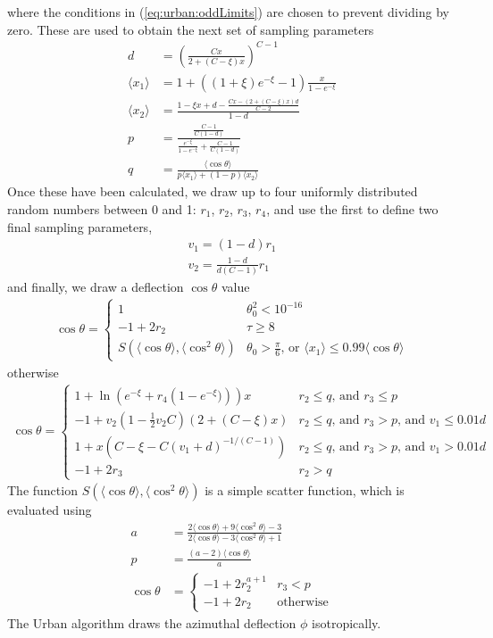 \documentclass[12pt]{article}
\numberwithin{equation}{section}
\begin{document}
%
where the conditions in (\ref{eq:urban:oddLimits}) are chosen to prevent dividing by zero. These are used to obtain the next set of sampling parameters
%
\begin{align}
  d &= \left(\frac{Cx}{2 + (C-\xi)x}\right)^{C-1} \\
  \langle x_1 \rangle &= 1+((1+\xi)e^{-\xi}-1)\frac{x}{1-e^{-\xi}} \\
  \langle x_2 \rangle &= \frac{1-\xi x + d - \frac{Cx-(2+(C-\xi)x)d}{C-2}}{1-d}\\
  p &= \frac{\frac{C-1}{C(1-d)}}{\frac{e^{-\xi}}{1-e^{-\xi}} + \frac{C-1}{C(1-d)}} \\
  q &= \frac{\langle\cos\theta\rangle}{p\langle x_1\rangle + (1-p)\langle x_2\rangle}
\end{align}
%
Once these have been calculated, we draw up to four uniformly distributed random numbers between 0 and 1: $r_1$, $r_2$, $r_3$, $r_4$, and use the first to define two final sampling parameters,
%
\begin{align}
  v_1 = (1-d)r_1 \\
  v_2 = \frac{1-d}{d(C-1)}r_1
\end{align}
%
and finally, we draw a deflection $\cos\theta$ value
%
\begin{align}
  \cos\theta = 
  \begin{cases}
    1         & \theta_0^2 < 10^{-16} \\
    -1 + 2r_2 & \tau \geq 8  \\
    S(\langle\cos\theta\rangle, \langle\cos^2\theta\rangle) & \theta_0 > \frac{\pi}{6} \text{, or } \langle x_1 \rangle\leq 0.99\langle\cos\theta\rangle
  \end{cases}
\end{align}
%
otherwise
%
\begin{align}
  \cos\theta = 
  \begin{cases}
    1 + \ln\left(e^{-\xi} + r_4\left(1-e^{-\xi})\right)\right)x & r_2 \leq q \text{, and } r_3 \leq p \\
    -1 + v_2(1-\frac{1}{2} v_2 C)(2 + (C-\xi)x) & r_2 \leq q \text{, and } r_3 > p \text{, and } v_1 \leq 0.01d \\
    1 + x\left(C - \xi - C(v_1 + d)^{-1/(C-1)}\right) & r_2 \leq q \text{, and } r_3 > p \text{, and } v_1 > 0.01d \\
    -1 + 2r_3 & r_2 > q
  \end{cases}
\end{align}
%
The function $S(\langle\cos\theta\rangle, \langle\cos^2\theta\rangle)$ is a simple scatter function, which is evaluated using
%
\begin{align}
  a &= \frac{2\langle\cos\theta\rangle + 9\langle\cos^2\theta\rangle - 3}{2\langle\cos\theta\rangle -3 \langle\cos^2\theta\rangle + 1}
  \\
  p &= \frac{(a-2)\langle\cos\theta\rangle}{a}
  \\
  \cos\theta &= 
  \begin{cases} 
    -1 + 2r_2^{a+1} & r_3 < p \\
    -1 + 2r_2 & \text{otherwise}
  \end{cases}
\end{align}
%
The Urban algorithm draws the azimuthal deflection $\phi$ isotropically.
\end{document}
